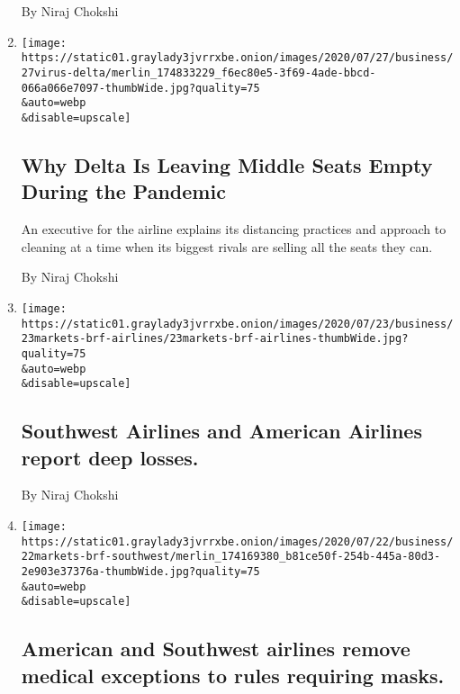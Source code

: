 \begin{enumerate}
  By Niraj Chokshi
\item
  \href{/2020/07/27/business/delta-airlines-bill-lentsch.html}{}

  \texttt{[image: https://static01.graylady3jvrrxbe.onion/images/2020/07/27/business/27virus-delta/merlin\_174833229\_f6ec80e5-3f69-4ade-bbcd-066a066e7097-thumbWide.jpg?quality=75\\\&auto=webp\\\&disable=upscale]}

  \hypertarget{why-delta-is-leaving-middle-seats-empty-during-the-pandemic}{%
  \subsection{Why Delta Is Leaving Middle Seats Empty During the
  Pandemic}\label{why-delta-is-leaving-middle-seats-empty-during-the-pandemic}}

  An executive for the airline explains its distancing practices and
  approach to cleaning at a time when its biggest rivals are selling all
  the seats they can.

  By Niraj Chokshi
\item
  \href{/2020/07/23/business/southwest-airlines-and-american-airlines-report-deep-losses.html}{}

  \texttt{[image: https://static01.graylady3jvrrxbe.onion/images/2020/07/23/business/23markets-brf-airlines/23markets-brf-airlines-thumbWide.jpg?quality=75\\\&auto=webp\\\&disable=upscale]}

  \hypertarget{southwest-airlines-and-american-airlines-report-deep-losses}{%
  \subsection{Southwest Airlines and American Airlines report deep
  losses.}\label{southwest-airlines-and-american-airlines-report-deep-losses}}

  By Niraj Chokshi
\item
  \href{/live/2020/07/22/business/stock-market-today-coronavirus/southwest-airlines-mask-policy}{}

  \texttt{[image: https://static01.graylady3jvrrxbe.onion/images/2020/07/22/business/22markets-brf-southwest/merlin\_174169380\_b81ce50f-254b-445a-80d3-2e903e37376a-thumbWide.jpg?quality=75\\\&auto=webp\\\&disable=upscale]}

  \hypertarget{american-and-southwest-airlines-remove-medical-exceptions-to-rules-requiring-masks}{%
  \subsection{American and Southwest airlines remove medical exceptions
  to rules requiring
  masks.}\label{american-and-southwest-airlines-remove-medical-exceptions-to-rules-requiring-masks}}


\end{enumerate}
